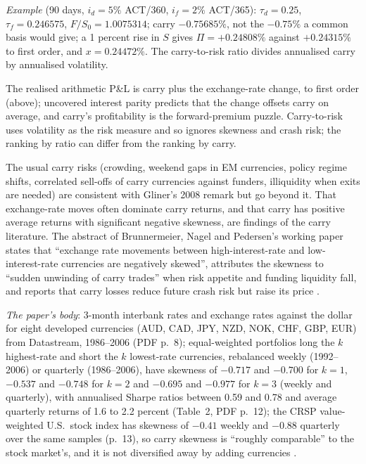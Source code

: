 \begin{qfmodel}
\emph{Example} (90 days, $i_d=5\%$ ACT/360, $i_f=2\%$ ACT/365): $\tau_d=0.25$, $\tau_f=0.246575$, $F/S_0=1.0075314$; carry $-0.75685\%$, not the $-0.75\%$ a common basis would give; a 1 percent rise in $S$ gives $\Pi=+0.24808\%$ against $+0.24315\%$ to first order, and $x=0.24472\%$. The carry-to-risk ratio divides annualised carry by annualised volatility.

 The realised arithmetic P\&L is carry plus the exchange-rate change, to first order (above); uncovered interest parity predicts that the change offsets carry on average, and carry's profitability is the forward-premium puzzle. Carry-to-risk uses volatility as the risk measure and so ignores skewness and crash risk; the ranking by ratio can differ from the ranking by carry.

 The usual carry risks (crowding, weekend gaps in EM currencies, policy regime shifts, correlated sell-offs of carry currencies against funders, illiquidity when exits are needed) are consistent with Gliner's 2008 remark but go beyond it. That exchange-rate moves often dominate carry returns, and that carry has positive average returns with significant negative skewness, are findings of the carry literature. The abstract of Brunnermeier, Nagel and Pedersen's working paper states that ``exchange rate movements between high-interest-rate and low-interest-rate currencies are negatively skewed'', attributes the skewness to ``sudden unwinding of carry trades'' when risk appetite and funding liquidity fall, and reports that carry losses reduce future crash risk but raise its price \citep[abstract, NBER Working Paper 14473, November 2008, revised December 2013]{catalogue-0241}.

\emph{The paper's body}: 3-month interbank rates and exchange rates against the dollar for eight developed currencies (AUD, CAD, JPY, NZD, NOK, CHF, GBP, EUR) from Datastream, 1986--2006 (PDF p.~8); equal-weighted portfolios long the $k$ highest-rate and short the $k$ lowest-rate currencies, rebalanced weekly (1992--2006) or quarterly (1986--2006), have skewness of $-0.717$ and $-0.700$ for $k=1$, $-0.537$ and $-0.748$ for $k=2$ and $-0.695$ and $-0.977$ for $k=3$ (weekly and quarterly), with annualised Sharpe ratios between 0.59 and 0.78 and average quarterly returns of 1.6 to 2.2 percent (Table~2, PDF p.~12); the CRSP value-weighted U.S.\ stock index has skewness of $-0.41$ weekly and $-0.88$ quarterly over the same samples (p.~13), so carry skewness is ``roughly comparable'' to the stock market's, and it is not diversified away by adding currencies \citep[working paper of November 2008, PDF pp.~8 and 12--13]{catalogue-0241}.


\end{qfmodel}
